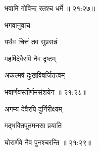 {\devanagarifont भवामि गोविन्द रतश्च धर्मे {॥ २१:२७॥} \veg\dontdisplaylinenum }%

\vers


{\devanagarifont भगवानुवाच {\dandab}\dontdisplaylinenum  }%
 
\nemsloka 
{\devanagarifont यथैव चित्तं तव सुप्रसन्नं }%
  \dontdisplaylinenum

\nemslokab

{\devanagarifont महर्षिदेवैरपि नैव दृष्टम्  \danda\dontdisplaylinenum }%
 
\nemslokac

{\devanagarifont अकल्मषं दुःखविवर्जितत्वम् }%
  \dontdisplaylinenum    {}%



\nemslokad

{\devanagarifont भवार्णवस्तीर्णमसंशयेन {॥ २१:२८॥} \veg\dontdisplaylinenum }%
 
\ujvers{}    %


\nemslokab

{\devanagarifont अगम्य देवैरपि दुर्निरीक्ष्यम्  \danda\dontdisplaylinenum }%

\nemslokac

{\devanagarifont मद्भक्तिपूतमनसा प्रयाति }%
  \dontdisplaylinenum    {}%



\nemslokad

{\devanagarifont घोरार्णवे नैव पुनश्चरन्ति {॥ २१:२९॥} \veg\dontdisplaylinenum }%
 
\vers


